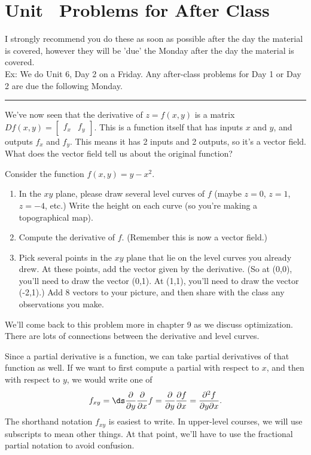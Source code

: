 \section{Unit \thechapter\ Problems for After Class}
I strongly recommend you do these as soon as possible after the day the material is covered, however they will be 'due' the Monday after the day the material is covered.\\
Ex: We do Unit 6, Day 2 on a Friday. Any after-class problems for Day 1 or Day 2 are due the following Monday. \\
\vskip0.1in
\hrule
\vskip0.1in
We've now seen that the derivative of $z=f(x,y)$ is a matrix $Df(x,y) = \begin{bmatrix}f_x & f_y\end{bmatrix}$. This is a function itself that has inputs $x$ and $y$, and outputs $f_x$ and $f_y$. This means it has 2 inputs and 2 outputs, so it's a vector field. What does the vector field tell us about the original function?
\begin{problem}[Day 2]
 Consider the function $f(x,y)=y-x^2$. 
\begin{enumerate}
 \item In the $xy$ plane, please draw several level curves of $f$ (maybe $z=0$, $z=1$, $z=-4$, etc.)  Write the height on each curve (so you're making a topographical map).
 \item Compute the derivative of $f$. (Remember this is now a vector field.)
 \item Pick several points in the $xy$ plane that lie on the level curves you already drew.  At these points, add the vector given by the derivative.  (So at (0,0), you'll need to draw the vector (0,1).  At (1,1), you'll need to draw the vector (-2,1).) Add 8 vectors to your picture, and then share with the class any observations you make.
\end{enumerate}

\end{problem}
We'll come back to this problem more in chapter 9 as we discuss optimization.  There are lots of connections between the derivative and level curves. 

Since a partial derivative is a function, we can take partial derivatives of that function as well.  
If we want to first compute a partial with respect to $x$, and then with respect to $y$, we would write one of $$f_{xy}=\ds\frac{\partial}{\partial y}\frac{\partial}{\partial x}f = \frac{\partial}{\partial y}\frac{\partial f}{\partial x} = \frac{\partial^2 f}{\partial y \partial x}.$$
The shorthand notation $f_{xy}$ is easiest to write. In upper-level courses, we will use subscripts to mean other things. At that point, we'll have to use the fractional partial notation to avoid confusion.


